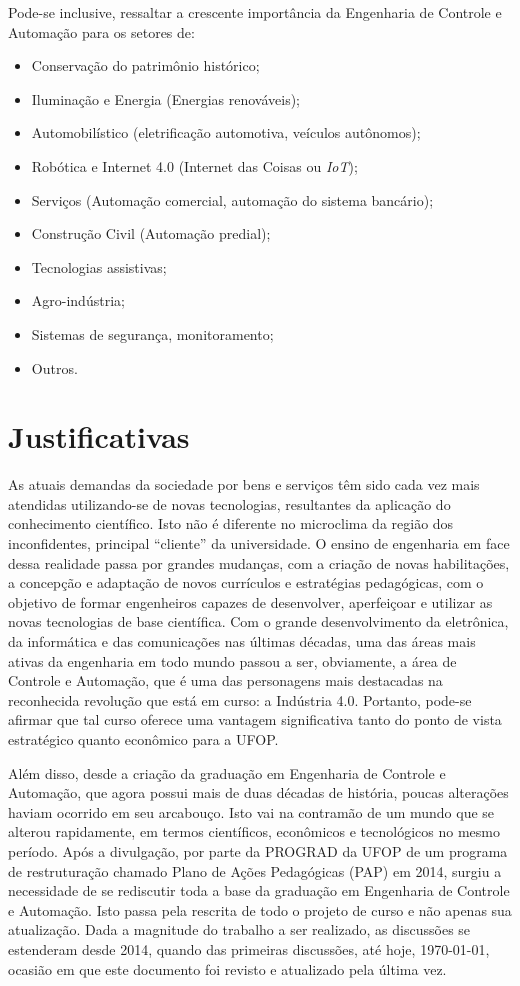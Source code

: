 \documentclass[
	12pt,				%
	openright,			%
	oneside,			%
	a4paper,			%
	english,			%
	brazil				%
	]{abntex2}
\begin{document}
Pode-se inclusive, ressaltar a crescente importância da Engenharia de Controle e Automação para os setores de:
\begin{itemize}
	\item Conservação do patrimônio histórico;
	\item Iluminação e Energia (Energias renováveis);
	\item Automobilístico (eletrificação automotiva, veículos autônomos);
	\item Robótica e Internet 4.0 (Internet das Coisas ou \textit{IoT});
	\item Serviços (Automação comercial, automação do sistema bancário);
	\item Construção Civil (Automação predial);
	\item Tecnologias assistivas;
	\item Agro-indústria;
	\item Sistemas de segurança, monitoramento;
	\item Outros.
\end{itemize}

\section{Justificativas}
As atuais demandas da sociedade por bens e serviços têm sido cada vez mais atendidas utilizando-se de novas tecnologias, resultantes da aplicação do conhecimento científico. Isto não é diferente no microclima da região dos inconfidentes, principal ``cliente'' da universidade. O ensino de engenharia em face dessa realidade passa por grandes mudanças, com a criação de novas habilitações, a concepção e adaptação de novos currículos e estratégias pedagógicas, com o objetivo de formar engenheiros capazes de desenvolver, aperfeiçoar e utilizar as novas tecnologias de base científica. Com o grande desenvolvimento da eletrônica, da informática e das comunicações nas últimas décadas, uma das áreas mais ativas da engenharia em todo mundo passou a ser, obviamente, a área de Controle e Automação, que é uma das personagens mais destacadas na reconhecida revolução que está  em curso: a Indústria 4.0. Portanto, pode-se afirmar que tal curso oferece uma vantagem  significativa tanto do ponto de vista estratégico quanto econômico para a UFOP.

Além disso, desde a criação da graduação em Engenharia de Controle e Automação, que agora possui mais de duas décadas de história, poucas alterações haviam ocorrido em seu  arcabouço. Isto vai na contramão de um mundo que se alterou rapidamente, em termos científicos, econômicos e tecnológicos no mesmo período. Após a divulgação, por parte da  PROGRAD da UFOP de um programa de restruturação chamado Plano de Ações  Pedagógicas (PAP) em 2014, surgiu a necessidade de se rediscutir toda a base da graduação  em Engenharia de Controle e Automação. Isto passa pela rescrita de todo o projeto de  curso e não apenas sua atualização. Dada a magnitude do trabalho a ser realizado, as  discussões se estenderam desde 2014, quando das primeiras discussões, até hoje, \today, ocasião em que este documento foi revisto e atualizado pela última vez.
\end{document}
